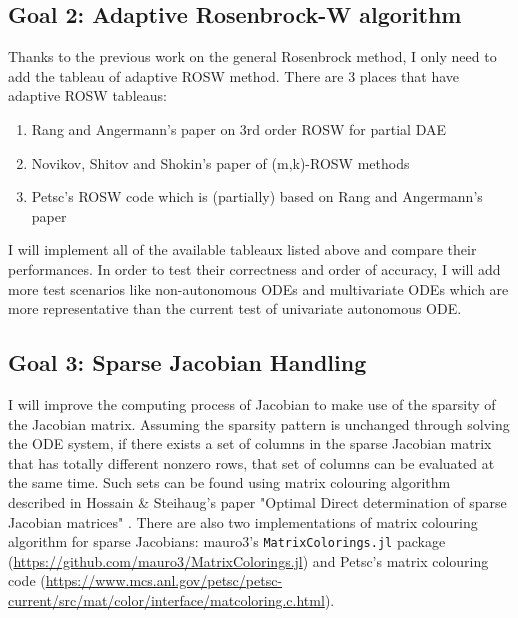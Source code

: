 \documentclass[a4paper]{article}
\begin{document}
\subsection{Goal 2: Adaptive Rosenbrock-W algorithm}
\label{sec:org78d2260}
Thanks to the previous work on the general Rosenbrock method, I only need to add
the tableau of adaptive ROSW method. There are 3 places that have adaptive ROSW
tableaus: 

\begin{enumerate}
\item Rang and Angermann's paper \cite{two} on 3rd order ROSW for partial DAE
\item Novikov, Shitov and Shokin's paper \cite{three} of (m,k)-ROSW methods
\item Petsc's ROSW code which is (partially) based on Rang and Angermann's paper
\end{enumerate}

I will implement all of the available tableaux listed above and compare their
performances. In order to test their correctness and order of accuracy, I will
add more test scenarios like non-autonomous ODEs and multivariate ODEs which are
more representative than the current test of univariate autonomous ODE. 

\subsection{Goal 3: Sparse Jacobian Handling}
\label{sec:org2bbde4a}
I will improve the computing process of Jacobian to make use of the sparsity of
the Jacobian matrix. Assuming the sparsity pattern is unchanged through solving
the ODE system, if there exists a set of columns in the sparse Jacobian matrix
that has totally different nonzero rows, that set of columns can be evaluated at
the same time. Such sets can be found using matrix colouring algorithm described
in Hossain \& Steihaug's paper "Optimal Direct determination of sparse Jacobian
matrices" \cite{four}. There are also two implementations of matrix colouring algorithm for
sparse Jacobians: mauro3's \texttt{MatrixColorings.jl} package
(\url{https://github.com/mauro3/MatrixColorings.jl}) and Petsc's matrix colouring code
(\url{https://www.mcs.anl.gov/petsc/petsc-current/src/mat/color/interface/matcoloring.c.html}).
\end{document}
